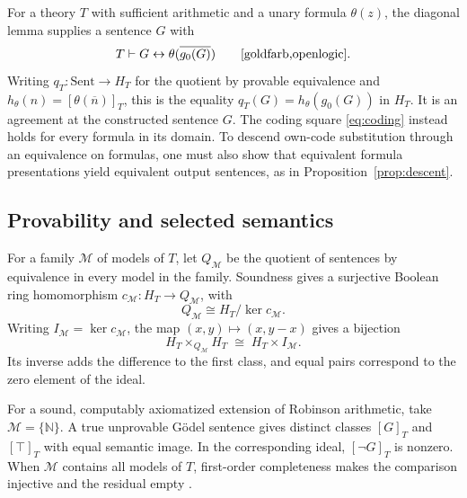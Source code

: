 For a theory \(T\) with sufficient arithmetic and a unary formula
\(\theta(z)\), the diagonal lemma supplies a sentence \(G\) with
\[
  T\vdash G\leftrightarrow\theta(\overline{g_0(G)})
  \qquad\text{\cite{goldfarb,openlogic}}.
\]
Writing \(q_T\colon\mathrm{Sent}\to H_T\) for the quotient by provable
equivalence and \(h_\theta(n)=[\theta(\overline n)]_T\), this is the equality
\(q_T(G)=h_\theta(g_0(G))\) in \(H_T\). It is an agreement at the
constructed sentence \(G\). The coding square \eqref{eq:coding} instead
holds for every formula in its domain. To descend own-code substitution
through an equivalence on formulas, one must also show that equivalent
formula presentations yield equivalent output sentences, as in
Proposition~\ref{prop:descent}.

\subsection{Provability and selected semantics}

For a family \(\mathcal M\) of models of \(T\), let \(Q_{\mathcal M}\)
be the quotient of sentences by equivalence in every model in the family.
Soundness gives a surjective Boolean ring homomorphism
\(c_{\mathcal M}\colon H_T\to Q_{\mathcal M}\), with
\[
 Q_{\mathcal M}\cong H_T/\ker c_{\mathcal M}.
\]
Writing \(I_{\mathcal M}=\ker c_{\mathcal M}\), the map
\((x,y)\mapsto (x,y-x)\) gives a bijection
\[
 H_T\times_{Q_{\mathcal M}}H_T\;\cong\; H_T\times I_{\mathcal M}.
\]
Its inverse adds the difference to the first class, and equal pairs
correspond to the zero element of the ideal.

For a sound, computably axiomatized extension of Robinson arithmetic,
take \(\mathcal M=\{\mathbb N\}\). A true unprovable G\"odel sentence
gives distinct classes \([G]_T\) and \([\top]_T\) with equal semantic image.
In the corresponding ideal, \([\neg G]_T\) is nonzero. When
\(\mathcal M\) contains all models of \(T\), first-order completeness
makes the comparison injective and the residual empty
\cite[Chapters 23 and 37]{openlogic}.
